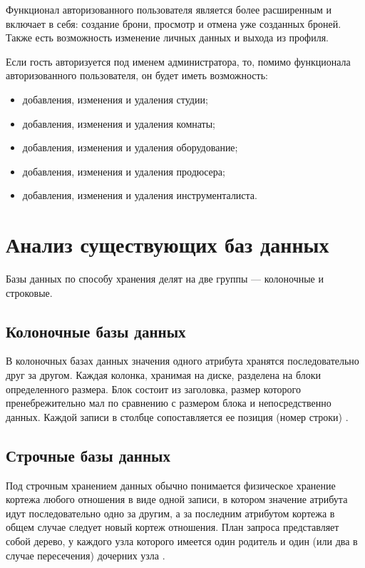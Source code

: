 Функционал авторизованного пользователя является более расширенным и включает в себя: создание брони, просмотр и отмена уже созданных броней. 
Также есть возможность изменение личных данных и выхода из профиля.

Если гость авторизуется под именем администратора, то, помимо функционала авторизованного пользователя, он будет иметь возможность:
\begin{itemize}
	\item добавления, изменения и удаления студии;
	\item добавления, изменения и удаления комнаты;
	\item добавления, изменения и удаления оборудование;
	\item добавления, изменения и удаления продюсера;
	\item добавления, изменения и удаления инструменталиста.
\end{itemize}
		




\section{Анализ существующих баз данных}
Базы данных по способу хранения делят на две группы --- колоночные и строковые.

\subsection{Колоночные базы данных}
В колоночных базах данных значения одного атрибута хранятся последовательно друг за другом.
Каждая колонка, хранимая на диске, разделена на блоки определенного размера.
Блок состоит из заголовка, размер которого пренебрежительно мал по сравнению с размером блока и непосредственно данных.
Каждой записи в столбце сопоставляется ее позиция (номер строки) \cite{strokovie_and_kolonochnie_bd}.
\subsection{Строчные базы данных}
Под строчным хранением данных обычно понимается физическое хранение кортежа любого отношения в виде одной записи, в котором значение атрибута идут последовательно одно за другим, а за последним атрибутом кортежа в общем случае следует новый кортеж отношения.
План запроса представляет собой дерево, у каждого узла которого имеется один родитель и один (или два в случае пересечения) дочерних узла
\cite{strokovie_and_kolonochnie_bd}.



